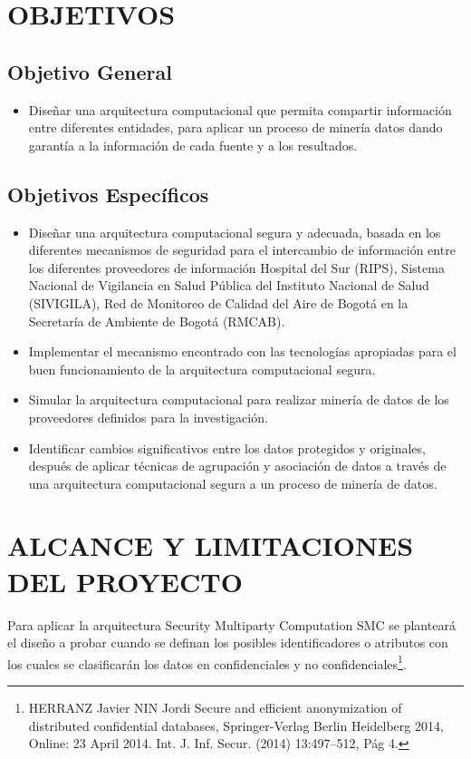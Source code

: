 \documentclass[a4paper,openright,12pt]{book}
\theoremstyle{definition}
\theoremstyle{remark}
\begin{document}
\section{OBJETIVOS}

\subsection{Objetivo General}
\begin{itemize}
\item Diseñar una arquitectura computacional que permita compartir información entre diferentes entidades, para aplicar un proceso de minería datos dando garantía a la información de cada fuente y a los resultados. 
\end{itemize}

\subsection{Objetivos Específicos}
\begin{itemize}
\item Diseñar una arquitectura computacional segura y adecuada, basada en los diferentes mecanismos de seguridad para el intercambio de información entre los diferentes proveedores de información Hospital del Sur (RIPS), Sistema Nacional de Vigilancia en Salud Pública del Instituto Nacional de Salud (SIVIGILA), Red de Monitoreo de Calidad del Aire de Bogotá en la Secretaría de Ambiente de Bogotá (RMCAB).
\item Implementar el mecanismo encontrado con las tecnologías apropiadas para el buen funcionamiento de la arquitectura computacional segura.
\item Simular la arquitectura computacional  para realizar minería de datos de los proveedores definidos para la investigación.
\item Identificar cambios significativos entre los datos protegidos y originales, después de aplicar técnicas de agrupación y asociación de datos a través de una arquitectura computacional segura a un proceso de minería de datos.

\end{itemize}

\section{ALCANCE Y LIMITACIONES DEL PROYECTO}

Para aplicar la arquitectura Security Multiparty Computation SMC se planteará el diseño a probar cuando se definan los posibles identificadores o atributos  con los cuales se clasificarán los datos en confidenciales y no confidenciales\footnote{HERRANZ Javier NIN Jordi Secure and efficient anonymization of distributed confidential databases, Springer-Verlag Berlin Heidelberg 2014, Online: 23 April 2014. Int. J. Inf. Secur. (2014) 13:497–512, Pág 4.}.
\end{document}
